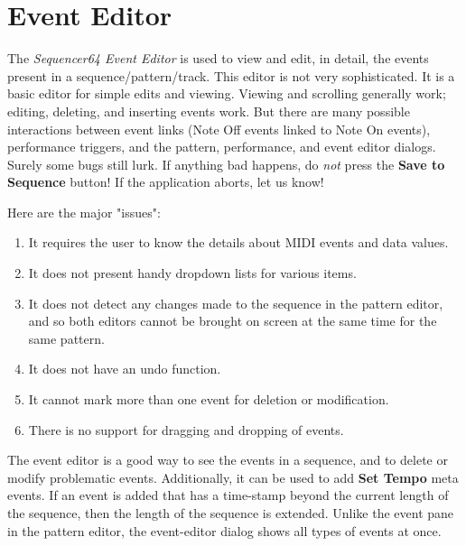 %
%

\section{Event Editor}
\label{sec:seq64_event_editor}

   The \textsl{Sequencer64 Event Editor} is used to view and edit,
   in detail, the events present in a sequence/pattern/track.
   This editor is not very sophisticated.
   It is a basic editor for simple edits and viewing.
   Viewing and scrolling generally work;
   editing, deleting, and inserting events work.
   But there are many possible interactions between event links (Note Off
   events linked to Note On events), performance triggers, and the pattern,
   performance, and event editor dialogs.
   Surely some bugs still lurk.
   If anything bad happens, do \textsl{not} press the
   \textbf{Save to Sequence} button!
   If the application aborts, let us know!

   Here are the major "issues":

   \begin{enumerate}
      \item It requires the user to know the details
         about MIDI events and data values.
      \item It does not present handy dropdown lists for various items.
      \item It does not detect any changes made to the sequence in the
         pattern editor, and so both editors cannot be brought on screen at the
         same time for the same pattern.
      \item It does not have an undo function.
      \item It cannot mark more than one event for deletion or modification.
      \item There is no support for dragging and dropping of events.
   \end{enumerate}

   The event editor is a good way to see the events in a sequence,
   and to delete or modify problematic events.
   Additionally, it can be used to add \textbf{Set Tempo} meta events.
   If an event is added that has a time-stamp beyond the current
   length of the sequence, then the length of the sequence is extended.
   Unlike the event pane in the pattern editor, the event-editor
   dialog shows all types of events at once.

